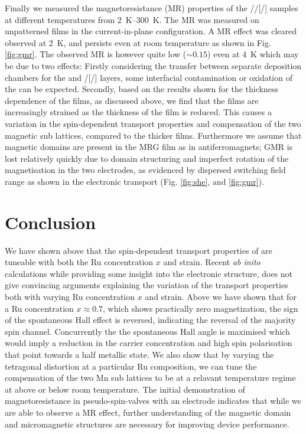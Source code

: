 \documentclass[reprint,aip,apl,floatfix,linenumbers,superscriptaddress]{revtex4-1}
\begin{document}
Finally we measured the magnetoresistance (MR) properties of the //[/] samples at different temperatures from \SIrange{2}{300}{\kelvin}. The MR was measured on unpatterned films in the current-in-plane configuration. A MR effect was cleared observed at \SI{2}{\kelvin}, and persists even at room temperature as shown in Fig. \ref{fig:gmr}. The observed MR is however quite low ($\sim \num{0.15}$) even at \SI{4}{\kelvin} which may be due to two effects: Firstly considering the transfer between separate deposition chambers for the  and /[/] layers, some interfacial contamination or oxidation of the  can be expected.  Secondly, based on the results shown for the thickness dependence of the  films, as discussed above, we find that the films are increasingly strained as the thickness of the film is reduced. This causes a variation in the spin-dependent transport properties and compensation of the two magnetic sub lattices, compared to the thicker films. Furthermore we assume that magnetic domains are present in the MRG film as in antiferromagnets; GMR is lost relatively quickly due to domain structuring and imperfect rotation of the magnetisation in the two electrodes, as evidenced by dispersed switching field range as shown in the electronic transport (Fig. \ref{fig:she}, and \ref{fig:gmr}).

\section{Conclusion}
\label{sec:conclusion}

We have shown above that the spin-dependent transport properties of  are tuneable with both the Ru concentration $x$ and strain. Recent \textit{ab inito} calculations \cite{galanakisJAP2013} while providing some insight into the electronic structure, does not give convincing arguments explaining the variation of the transport properties both with varying Ru concentration $x$ and strain. Above we have shown that for a Ru concentration $x\approx\num{0.7}$, which shows practically zero magnetization, the sign of the spontaneous Hall effect is reversed, indicating the reversal of the majority spin channel. Concurrently the the spontaneous Hall angle is maximised which would imply a reduction in the carrier concentration and high spin polarisation that point towards a half metallic state. We also show that by varying the tetragonal distortion at a particular Ru composition, we can tune the compensation of the two Mn sub lattices to be at a relavant temperature regime at above or below room temperature. 
The initial demonstration of magnetoresistance in pseudo-spin-valves with an  electrode indicates that while we are able to observe a MR effect, further understanding of the magnetic domain and micromagnetic structures are necessary for improving device performance.  
\end{document}
